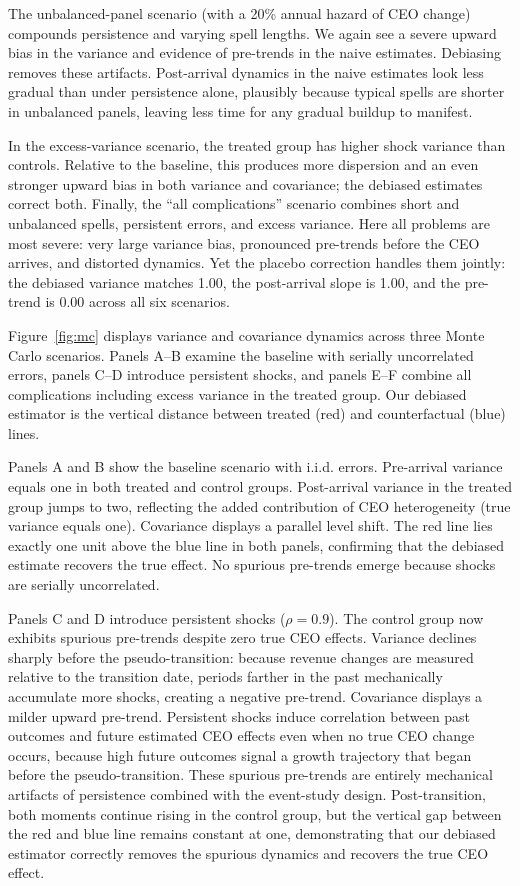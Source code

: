 \documentclass[11pt,a4paper]{article}
\begin{document}
The unbalanced-panel scenario (with a 20\% annual hazard of CEO change) compounds persistence and varying spell lengths. We again see a severe upward bias in the variance and evidence of pre-trends in the naive estimates. Debiasing removes these artifacts. Post-arrival dynamics in the naive estimates look less gradual than under persistence alone, plausibly because typical spells are shorter in unbalanced panels, leaving less time for any gradual buildup to manifest.

In the excess-variance scenario, the treated group has higher shock variance than controls. Relative to the baseline, this produces more dispersion and an even stronger upward bias in both variance and covariance; the debiased estimates correct both. Finally, the ``all complications'' scenario combines short and unbalanced spells, persistent errors, and excess variance. Here all problems are most severe: very large variance bias, pronounced pre-trends before the CEO arrives, and distorted dynamics. Yet the placebo correction handles them jointly: the debiased variance matches 1.00, the post-arrival slope is 1.00, and the pre-trend is 0.00 across all six scenarios. 

Figure~\ref{fig:mc} displays variance and covariance dynamics across three Monte Carlo scenarios. Panels A--B examine the baseline with serially uncorrelated errors, panels C--D introduce persistent shocks, and panels E--F combine all complications including excess variance in the treated group. Our debiased estimator is the vertical distance between treated (red) and counterfactual (blue) lines.

Panels A and B show the baseline scenario with i.i.d. errors. Pre-arrival variance equals one in both treated and control groups. Post-arrival variance in the treated group jumps to two, reflecting the added contribution of CEO heterogeneity (true variance equals one). Covariance displays a parallel level shift. The red line lies exactly one unit above the blue line in both panels, confirming that the debiased estimate recovers the true effect. No spurious pre-trends emerge because shocks are serially uncorrelated. 

Panels C and D introduce persistent shocks ($\rho=0.9$). The control group now exhibits spurious pre-trends despite zero true CEO effects. Variance declines sharply before the pseudo-transition: because revenue changes are measured relative to the transition date, periods farther in the past mechanically accumulate more shocks, creating a negative pre-trend. Covariance displays a milder upward pre-trend. Persistent shocks induce correlation between past outcomes and future estimated CEO effects even when no true CEO change occurs, because high future outcomes signal a growth trajectory that began before the pseudo-transition. These spurious pre-trends are entirely mechanical artifacts of persistence combined with the event-study design. Post-transition, both moments continue rising in the control group, but the vertical gap between the red and blue line remains constant at one, demonstrating that our debiased estimator correctly removes the spurious dynamics and recovers the true CEO effect.
\end{document}
